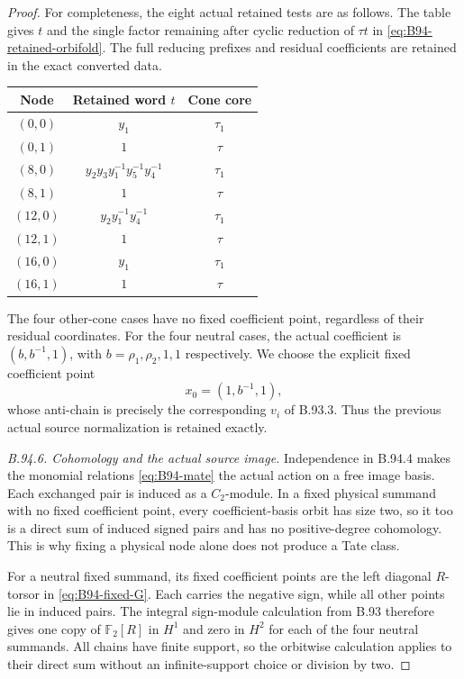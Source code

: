 \begin{proof}
For completeness, the eight actual retained tests are as follows.
The table gives $t$ and the single factor remaining after cyclic
reduction of $\tau t$ in \eqref{eq:B94-retained-orbifold}.
The full reducing prefixes and residual coefficients are retained
in the exact converted data.
\begin{center}
\begin{tabular}{ccc}
Node&Retained word $t$&Cone core\\\hline
$(0,0)$&$y_1$&$\tau_1$\\
$(0,1)$&$1$&$\tau$\\
$(8,0)$&$y_2y_3y_1^{-1}y_5^{-1}y_4^{-1}$&$\tau_1$\\
$(8,1)$&$1$&$\tau$\\
$(12,0)$&$y_2y_1^{-1}y_4^{-1}$&$\tau_1$\\
$(12,1)$&$1$&$\tau$\\
$(16,0)$&$y_1$&$\tau_1$\\
$(16,1)$&$1$&$\tau$
\end{tabular}
\end{center}
The four other-cone cases have no fixed coefficient point,
regardless of their residual coordinates. For the four neutral
cases, the actual coefficient is $(b,b^{-1},1)$, with
$b=\rho_1,\rho_2,1,1$ respectively. We choose the explicit
fixed coefficient point
\[
                              x_0=(1,b^{-1},1),
\]
whose anti-chain is precisely the corresponding $v_i$ of
B.93.3. Thus the previous actual
source normalization is retained exactly.

\emph{B.94.6. Cohomology and the actual source image.}
Independence in B.94.4 makes the monomial relations
\eqref{eq:B94-mate} the actual action on a free image basis.
Each exchanged pair is induced as a $C_2$-module. In a fixed
physical summand with no fixed coefficient point, every
coefficient-basis orbit has size two, so it too is a direct
sum of induced signed pairs and has no positive-degree
cohomology. This is why fixing a physical node alone does
not produce a Tate class.

For a neutral fixed summand, its fixed coefficient points
are the left diagonal $R$-torsor in \eqref{eq:B94-fixed-G}.
Each carries the negative sign, while all other points lie
in induced pairs. The integral sign-module calculation from
B.93 therefore gives one copy of $\mathbb F_2[R]$ in
$H^1$ and zero in $H^2$ for each of the four neutral summands.
All chains have finite support, so the orbitwise calculation
applies to their direct sum without an infinite-support
choice or division by two.


\end{proof}

